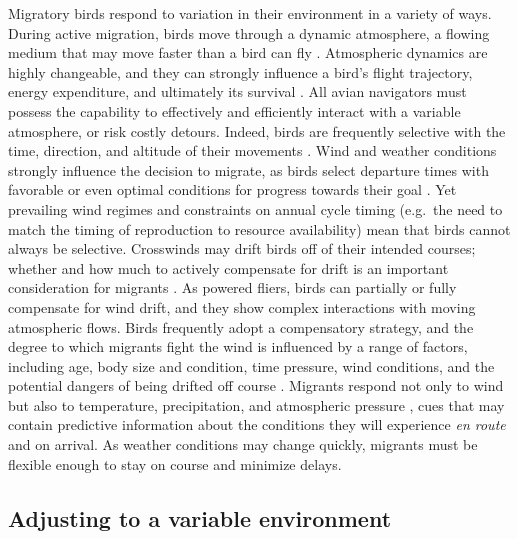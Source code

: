 \documentclass[a4paper, nobind]{templates/ociamthesis}
\begin{document}
Migratory birds respond to variation in their environment in a variety of ways. During active migration, birds move through a dynamic atmosphere, a flowing medium that may move faster than a bird can fly \autocite{chapmanAnimalOrientationStrategies2011}. Atmospheric dynamics are highly changeable, and they can strongly influence a bird's flight trajectory, energy expenditure, and ultimately its survival \autocite{richardsonTimingBirdMigration1990}. All avian navigators must possess the capability to effectively and efficiently interact with a variable atmosphere, or risk costly detours. Indeed, birds are frequently selective with the time, direction, and altitude of their movements \autocite{schmaljohannTransSaharaMigrantsSelect2009,dokterHighAltitudeBird2013}. Wind and weather conditions strongly influence the decision to migrate, as birds select departure times with favorable or even optimal conditions for progress towards their goal \autocite{akessonWindSelectivityMigratory2000,erniWindRainGovern2002}. Yet prevailing wind regimes and constraints on annual cycle timing (e.g.~the need to match the timing of reproduction to resource availability) mean that birds cannot always be selective. Crosswinds may drift birds off of their intended courses; whether and how much to actively compensate for drift is an important consideration for migrants \autocite{liechtiBirdsBlowinWind2006}. As powered fliers, birds can partially or fully compensate for wind drift, and they show complex interactions with moving atmospheric flows. Birds frequently adopt a compensatory strategy, and the degree to which migrants fight the wind is influenced by a range of factors, including age, body size and condition, time pressure, wind conditions, and the potential dangers of being drifted off course \autocite{liechtiBirdsBlowinWind2006,alerstamOptimalBirdMigration2011,chapmanAdaptiveStrategiesNocturnally2016,hortonNocturnallyMigratingSongbirds2016}. Migrants respond not only to wind but also to temperature, precipitation, and atmospheric pressure \autocite{richardsonTimingBirdMigration1990}, cues that may contain predictive information about the conditions they will experience \emph{en route} and on arrival. As weather conditions may change quickly, migrants must be flexible enough to stay on course and minimize delays.

\hypertarget{adjusting-to-a-variable-environment}{%
\subsection*{Adjusting to a variable environment}\label{adjusting-to-a-variable-environment}}
\end{document}
